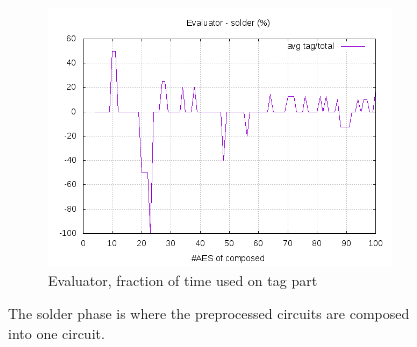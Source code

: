 \documentclass[10pt,a4paper]{article}
\begin{document}
\begin{figure}[h]
\begin{subfigure}[t]{0.3\textwidth}
        \includegraphics[width=\textwidth]{eval_solder_frac}
        \caption{Evaluator, fraction of time used on tag part}
    \end{subfigure}
    \caption{The solder phase is where the preprocessed circuits are composed into one circuit.}
    \label{data solder}
\end{figure}
\end{document}
